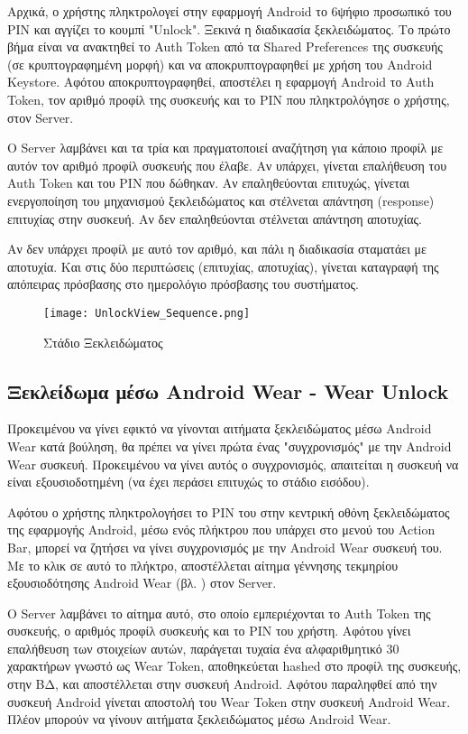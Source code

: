 		Αρχικά, ο χρήστης πληκτρολογεί στην εφαρμογή Android το 6ψήφιο προσωπικό του PIN και αγγίζει το κουμπί "Unlock". Ξεκινά η διαδικασία ξεκλειδώματος. Το πρώτο βήμα είναι να ανακτηθεί το Auth Token από τα Shared Preferences της συσκευής (σε κρυπτογραφημένη μορφή) και να αποκρυπτογραφηθεί με χρήση του Android Keystore. Αφότου αποκρυπτογραφηθεί, αποστέλει η εφαρμογή Android το Auth Token, τον αριθμό προφίλ της συσκευής και το PIN που πληκτρολόγησε ο χρήστης, στον Server.

		Ο Server λαμβάνει και τα τρία και πραγματοποιεί αναζήτηση για κάποιο προφίλ με αυτόν τον αριθμό προφίλ συσκευής που έλαβε. Αν υπάρχει, γίνεται επαλήθευση του Auth Token και του PIN που δώθηκαν. Αν επαληθεύονται επιτυχώς, γίνεται ενεργοποίηση του μηχανισμού ξεκλειδώματος και στέλνεται απάντηση (response) επιτυχίας στην συσκευή. Αν δεν επαληθεύονται στέλνεται απάντηση αποτυχίας.

		Αν δεν υπάρχει προφίλ με αυτό τον αριθμό, και πάλι η διαδικασία σταματάει με αποτυχία. Και στις δύο περιπτώσεις (επιτυχίας, αποτυχίας), γίνεται καταγραφή της απόπειρας πρόσβασης στο ημερολόγιο πρόσβασης του συστήματος.

		\begin{figure}[h]
			\centering
				\texttt{[image: UnlockView\_Sequence.png]}
			\caption{Στάδιο Ξεκλειδώματος}
			\label{fig:unlock_stage}
		\end{figure}

	\subsection{Ξεκλείδωμα μέσω Android Wear - Wear Unlock}
		Προκειμένου να γίνει εφικτό να γίνονται αιτήματα ξεκλειδώματος μέσω Android Wear κατά βούληση, θα πρέπει να γίνει πρώτα ένας "συγχρονισμός" με την Android Wear συσκευή. Προκειμένου να γίνει αυτός ο συγχρονισμός, απαιτείται η συσκευή να είναι εξουσιοδοτημένη (να έχει περάσει επιτυχώς το στάδιο εισόδου).

		Αφότου ο χρήστης πληκτρολογήσει το PIN του στην κεντρική οθόνη ξεκλειδώματος της εφαρμογής Android, μέσω ενός πλήκτρου που υπάρχει στο μενού του Action Bar, μπορεί να ζητήσει να γίνει συγχρονισμός με την Android Wear συσκευή του. Με το κλικ σε αυτό το πλήκτρο, αποστέλλεται αίτημα γέννησης τεκμηρίου εξουσιοδότησης Android Wear (βλ. ) στον Server.

		Ο Server λαμβάνει το αίτημα αυτό, στο οποίο εμπεριέχονται το Auth Token της συσκευής, ο αριθμός προφίλ συσκευής και το PIN του χρήστη. Αφότου γίνει επαλήθευση των στοιχείων αυτών, παράγεται τυχαία ένα αλφαριθμητικό 30 χαρακτήρων γνωστό ως Wear Token, αποθηκεύεται hashed στο προφίλ της συσκευής, στην ΒΔ, και αποστέλλεται στην συσκευή Android. Αφότου παραληφθεί από την συσκευή Android γίνεται αποστολή του Wear Token στην συσκευή Android Wear. Πλέον μπορούν να γίνουν αιτήματα ξεκλειδώματος μέσω Android Wear.

